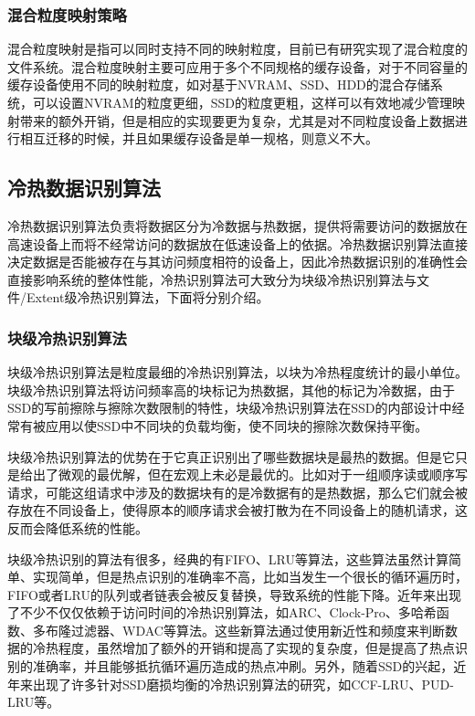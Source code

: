 \subsubsection{混合粒度映射策略}

混合粒度映射是指可以同时支持不同的映射粒度，目前已有研究实现了混合粒度的文件系统\cite{何耀2016面向}。混合粒度映射主要可应用于多个不同规格的缓存设备，对于不同容量的缓存设备使用不同的映射粒度，如对基于NVRAM、SSD、HDD的混合存储系统，可以设置NVRAM的粒度更细，SSD的粒度更粗，这样可以有效地减少管理映射带来的额外开销，但是相应的实现要更为复杂，尤其是对不同粒度设备上数据进行相互迁移的时候，并且如果缓存设备是单一规格，则意义不大。

\subsection{冷热数据识别算法}

冷热数据识别算法负责将数据区分为冷数据与热数据，提供将需要访问的数据放在高速设备上而将不经常访问的数据放在低速设备上的依据。冷热数据识别算法直接决定数据是否能被存在与其访问频度相符的设备上，因此冷热数据识别的准确性会直接影响系统的整体性能，冷热识别算法可大致分为块级冷热识别算法与文件/Extent级冷热识别算法，下面将分别介绍。

\subsubsection{块级冷热识别算法}

块级冷热识别算法是粒度最细的冷热识别算法，以块为冷热程度统计的最小单位。块级冷热识别算法将访问频率高的块标记为热数据，其他的标记为冷数据，由于SSD的写前擦除与擦除次数限制的特性，块级冷热识别算法在SSD的内部设计中经常有被应用以使SSD中不同块的负载均衡，使不同块的擦除次数保持平衡。

块级冷热识别算法的优势在于它真正识别出了哪些数据块是最热的数据。但是它只是给出了微观的最优解，但在宏观上未必是最优的。比如对于一组顺序读或顺序写请求，可能这组请求中涉及的数据块有的是冷数据有的是热数据，那么它们就会被存放在不同设备上，使得原本的顺序请求会被打散为在不同设备上的随机请求，这反而会降低系统的性能。

块级冷热识别的算法有很多，经典的有FIFO、LRU等算法，这些算法虽然计算简单、实现简单，但是热点识别的准确率不高，比如当发生一个很长的循环遍历时，FIFO或者LRU的队列或者链表会被反复替换，导致系统的性能下降。近年来出现了不少不仅仅依赖于访问时间的冷热识别算法，如ARC\cite{megiddo2003arc}、Clock-Pro\cite{jiang2005clock}、多哈希函数\cite{hsieh2006efficient}、多布隆过滤器\cite{park2011hot}、WDAC\cite{park2011hot}等算法。这些新算法通过使用新近性和频度来判断数据的冷热程度，虽然增加了额外的开销和提高了实现的复杂度，但是提高了热点识别的准确率，并且能够抵抗循环遍历造成的热点冲刷。另外，随着SSD的兴起，近年来出现了许多针对SSD磨损均衡的冷热识别算法的研究，如CCF-LRU\cite{li2009ccf}、PUD-LRU\cite{hu2010pud}等。

